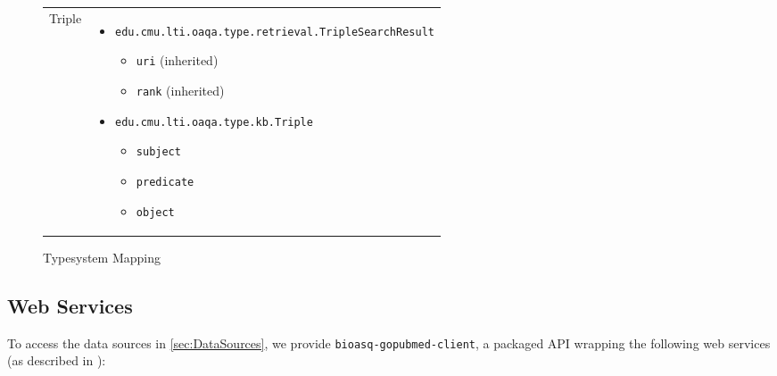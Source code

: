 \begin{figure}[h!]
\begin{longtable}{c|P{6cm}}
Triple & \begin{itemize} \item \verb|edu.cmu.lti.oaqa.type.retrieval.TripleSearchResult| \begin{itemize} \item \verb|uri| (inherited) \item \verb|rank| (inherited) \end{itemize}  \item \verb|edu.cmu.lti.oaqa.type.kb.Triple| \begin{itemize} \item \verb|subject| \item \verb|predicate| \item \verb|object|  \end{itemize} \end{itemize} \\
\end{longtable}
\label{ref:mappings}
\caption{Typesystem Mapping}
\end{figure}
\subsection{Web Services}
\label{subsec:WebServices}
To access the data sources in \ref{sec:DataSources}, we provide \verb|bioasq-gopubmed-client|, a packaged API wrapping the following web services (as described in \cite{101}):

